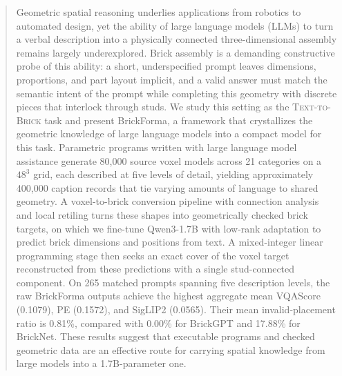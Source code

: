 \begin{abstract}
Geometric spatial reasoning underlies applications from robotics to automated design, yet the ability of large language models (LLMs) to turn a verbal description into a physically connected three-dimensional assembly remains largely underexplored. Brick assembly is a demanding constructive probe of this ability: a short, underspecified prompt leaves dimensions, proportions, and part layout implicit, and a valid answer must match the semantic intent of the prompt while completing this geometry with discrete pieces that interlock through studs. We study this setting as the \textsc{Text-to-Brick} task and present BrickForma, a framework that crystallizes the geometric knowledge of large language models into a compact model for this task. Parametric programs written with large language model assistance generate 80,000 source voxel models across 21 categories on a $48^3$ grid, each described at five levels of detail, yielding approximately 400,000 caption records that tie varying amounts of language to shared geometry. A voxel-to-brick conversion pipeline with connection analysis and local retiling turns these shapes into geometrically checked brick targets, on which we fine-tune Qwen3-1.7B with low-rank adaptation to predict brick dimensions and positions from text. A mixed-integer linear programming stage then seeks an exact cover of the voxel target reconstructed from these predictions with a single stud-connected component. On 265 matched prompts spanning five description levels, the raw BrickForma outputs achieve the highest aggregate mean VQAScore (0.1079), PE (0.1572), and SigLIP2 (0.0565). Their mean invalid-placement ratio is 0.81\%, compared with 0.00\% for BrickGPT and 17.88\% for BrickNet. These results suggest that executable programs and checked geometric data are an effective route for carrying spatial knowledge from large models into a 1.7B-parameter one.
\end{abstract}
